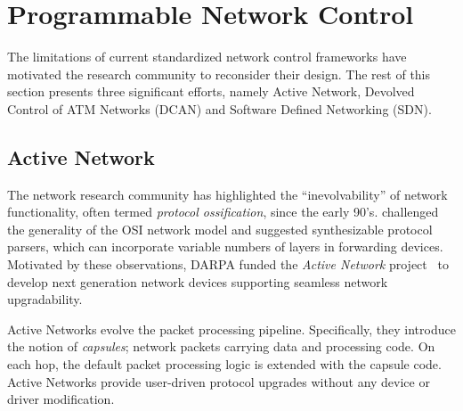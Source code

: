 \section{Programmable Network Control} \label{sec:background:prog_control}

The limitations of current standardized network control frameworks have
motivated the research community to reconsider their design.  The rest of this
section presents three significant efforts, namely Active Network, Devolved
Control of ATM Networks (DCAN) and Software Defined Networking (SDN). 

\subsection{Active Network}

The network research community has highlighted the ``inevolvability'' of network
functionality, often termed \textit{protocol ossification}, since the early
90's.   challenged the generality of the OSI network model
and suggested synthesizable protocol parsers, which can incorporate variable
numbers of layers in forwarding devices.  Motivated by these observations, DARPA
funded the \emph{Active Network} project~ to develop
next generation network devices supporting seamless network upgradability. 

Active Networks evolve the packet processing pipeline. Specifically, they
introduce the notion of \emph{capsules};  network packets carrying data and
processing code. On each hop, the default packet processing logic is extended
with the capsule code. Active Networks provide user-driven protocol upgrades
without any device or driver modification.  

